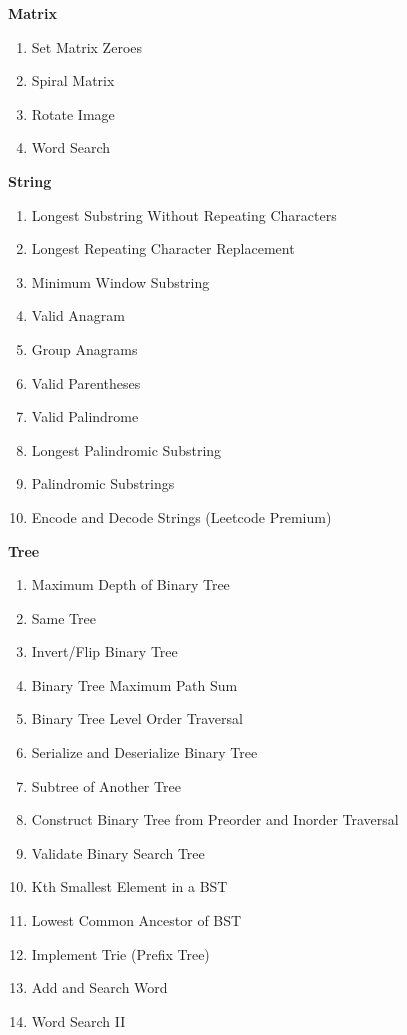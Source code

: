 \documentclass[24pt, a4]{article}
\begin{document}
\begin{multicols}{2}

\textbf{Matrix}
\begin{enumerate}
	\item{Set Matrix Zeroes}
	\item{Spiral Matrix}
	\item{Rotate Image}
	\item{Word Search}
\end{enumerate}

\textbf{String}
\begin{enumerate}
	\item{Longest Substring Without Repeating Characters}
	\item{Longest Repeating Character Replacement}
	\item{Minimum Window Substring}
	\item{Valid Anagram}
	\item{Group Anagrams}
	\item{Valid Parentheses}
	\item{Valid Palindrome}
	\item{Longest Palindromic Substring}
	\item{Palindromic Substrings}
	\item{Encode and Decode Strings (Leetcode Premium)}
\end{enumerate}

\columnbreak

\textbf{Tree}
\begin{enumerate}
	\item{Maximum Depth of Binary Tree}
	\item{Same Tree}
	\item{Invert/Flip Binary Tree}
	\item{Binary Tree Maximum Path Sum}
	\item{Binary Tree Level Order Traversal}
	\item{Serialize and Deserialize Binary Tree}
	\item{Subtree of Another Tree}
	\item{Construct Binary Tree from Preorder and Inorder Traversal}
	\item{Validate Binary Search Tree}
	\item{Kth Smallest Element in a BST}
	\item{Lowest Common Ancestor of BST}
	\item{Implement Trie (Prefix Tree)}
	\item{Add and Search Word}
	\item{Word Search II}
\end{enumerate}

\end{multicols}
\end{document}
